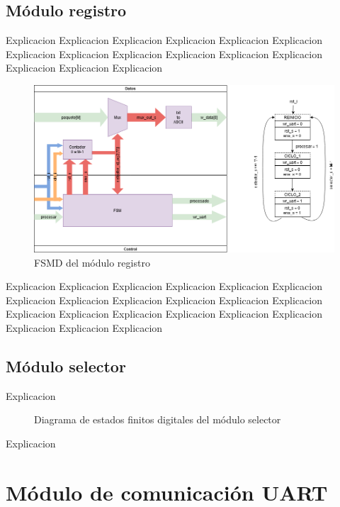 	\subsection{Módulo registro}
	
		Explicacion Explicacion Explicacion Explicacion Explicacion Explicacion Explicacion Explicacion Explicacion Explicacion Explicacion Explicacion Explicacion Explicacion Explicacion 
		
		\begin{figure}[h]
		\centering
			\includegraphics[scale=.4]{./Figures/FSMD-Registro}
			\caption{FSMD del módulo registro}
			\label{fig:FSMD_Registro}
		\end{figure}

		Explicacion Explicacion Explicacion Explicacion Explicacion Explicacion Explicacion Explicacion Explicacion Explicacion Explicacion Explicacion Explicacion Explicacion Explicacion Explicacion Explicacion Explicacion Explicacion Explicacion Explicacion 
		
	\subsection{Módulo selector}
	
		Explicacion 
		
		\begin{figure}[h]
		\centering
			\caption{Diagrama de estados finitos digitales del módulo selector}
			\label{fig:FSMD_Selector}
		\end{figure}
		
		Explicacion 
		
\section{Módulo de comunicación UART}

